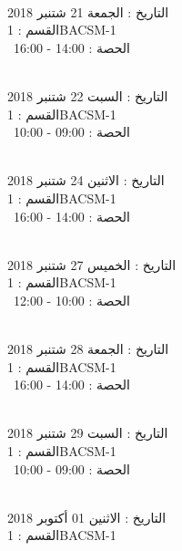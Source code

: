 \documentclass[14pt a4paper twocolumn]{book}
\begin{document}
\noindent\makebox[\linewidth]{\rule{\paperwidth}{0.4pt}}
 \\
التاريخ : الجمعة 21 شتنبر 2018 \\
القسم : 1BACSM-1 \\
 \  
الحصة : 14:00 - 16:00 \\
\par
\noindent\makebox[\linewidth]{\rule{\paperwidth}{0.4pt}}
 \\
التاريخ : السبت 22 شتنبر 2018 \\
القسم : 1BACSM-1 \\
 \  
الحصة : 09:00 - 10:00 \\
\par
\noindent\makebox[\linewidth]{\rule{\paperwidth}{0.4pt}}
 \\
التاريخ : الاثنين 24 شتنبر 2018 \\
القسم : 1BACSM-1 \\
 \  
الحصة : 14:00 - 16:00 \\
\par
\noindent\makebox[\linewidth]{\rule{\paperwidth}{0.4pt}}
 \\
التاريخ : الخميس 27 شتنبر 2018 \\
القسم : 1BACSM-1 \\
 \  
الحصة : 10:00 - 12:00 \\
\par
\noindent\makebox[\linewidth]{\rule{\paperwidth}{0.4pt}}
 \\
التاريخ : الجمعة 28 شتنبر 2018 \\
القسم : 1BACSM-1 \\
 \  
الحصة : 14:00 - 16:00 \\
\par
\noindent\makebox[\linewidth]{\rule{\paperwidth}{0.4pt}}
 \\
التاريخ : السبت 29 شتنبر 2018 \\
القسم : 1BACSM-1 \\
 \  
الحصة : 09:00 - 10:00 \\
\par
\noindent\makebox[\linewidth]{\rule{\paperwidth}{0.4pt}}
 \\
التاريخ : الاثنين 01 أكتوبر 2018 \\
القسم : 1BACSM-1 \\
\end{document}
